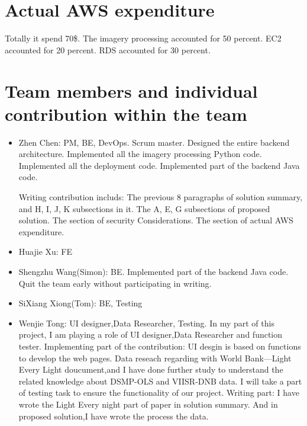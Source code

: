\documentclass[conference]{IEEEtran}
\begin{document}
\section{Actual AWS expenditure}

Totally it spend 70\$. The imagery processing accounted for 50 percent. EC2 accounted for 20 percent. RDS accounted for 30 percent.

\section{Team members and individual contribution within the team}
\begin{itemize}
    \item Zhen Chen: PM, BE, DevOps. Scrum master. Designed the entire backend architecture. Implemented all the imagery processing Python code. Implemented all the deployment code. 
    Implemented part of the backend Java code. 
    
    Writing contribution includs: The previous 8 paragraphs of solution summary, and H, I, J, K subsections in it. The A, E, G subsections of proposed solution. The section of security Considerations. The section of actual AWS expenditure.

    \item Huajie Xu: FE
    \item Shengzhu Wang(Simon): BE. Implemented part of the backend Java code. Quit the team early without participating in writing.
    \item SiXiang Xiong(Tom): BE, Testing
    \item Wenjie Tong: UI designer,Data Researcher, Testing.
    In my part of this project, I am playing a role of UI designer,Data Researcher and function tester. 
    Implementing part of the contribution:
    UI desgin is based on functions to develop the web pages.
    Data reseach regarding with World Bank---Light Every Light doucument,and I have done further study to understand the related knowledge about DSMP-OLS and VIISR-DNB data.
    I will take a part of testing task to ensure the functionality of our project.
    Writing part:
   I have wrote the Light Every night part of paper in solution summary. And in proposed solution,I have wrote the process the data.
    
\end{itemize}
  
\printbibliography
\end{document}
